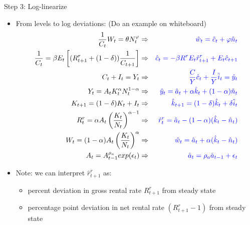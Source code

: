 \documentclass[9pt,xcolor={dvipsnames}]{beamer}
\newcommand{\bit}{\begin{itemize}}
\newcommand{\eit}{\end{itemize}}
\newcommand{\bc}{\color{blue}}
\newcommand{\rc}{\color{red}}
\begin{document}
\begin{frame}{Step 3: Log-linearize}

\bit
\setlength\itemsep{1em}

\item From levels to log deviations: {\rc(Do an example on whiteboard)}
\begin{eqnarray}
\frac{1}{C_t}W_t = \theta N_t^{\varphi} &\Rightarrow& {\bc \hat w_t = \hat c_t + \varphi \hat n_t} \nonumber \\
\frac{1}{C_t} = \beta E_t\left[(R^{r}_{t+1}+(1-\delta)) \frac{1}{C_{t+1}} \right] &\Rightarrow& {\bc 
\hat c_t = - \beta R^{r} E_t \hat r^{r}_{t+1} + E_t \hat {c}_{t+1}} \nonumber \\
C_t + I_t = Y_t &\Rightarrow& {\bc \frac{C}{Y}\hat c_t + \frac{I}{Y} \hat i_t = \hat y_t} \nonumber \\
Y_t = A_t K_t^{\alpha}N_t^{1-\alpha} &\Rightarrow& {\bc \hat y_t = \hat a_t + \alpha \hat k_t + (1-\alpha ) \hat n_t} \nonumber \\
K_{t+1} = (1-\delta) K_t + I_t &\Rightarrow& {\bc \nonumber \hat k_{t+1} = (1-\delta) \hat k_t +\delta \hat i_t} \nonumber\\
R^{r}_t = \alpha A_t \left(\frac{K_t}{N_t}\right)^{\alpha-1}  &\Rightarrow& {\bc \hat r^{r}_t = \hat a_t -(1-\alpha)(\hat k_t - \hat n_t)}  \nonumber \\
W_t = (1-\alpha) A_t \left(\frac{K_t}{N_t}\right)^{\alpha} &\Rightarrow& {\bc  \hat w_t = \hat a_t + \alpha (\hat k_t-\hat n_t)} \nonumber \\
A_t = A_{t-1}^{\rho_a}exp(\epsilon_t) &\Rightarrow& {\bc  \hat a_t = \rho_a \hat a_{t-1} + \epsilon_{t}} \nonumber
\end{eqnarray}

\item Note: we can interpret $\hat r^r_{t+1}$ as:
\bit
\setlength\itemsep{0.5em}
	\item percent deviation in gross rental rate $R^r_{t+1}$ from steady state
	
	\item percentage point deviation in net rental rate $(R^r_{t+1}-1)$ from steady state
\eit

\eit

\end{frame}
\end{document}
